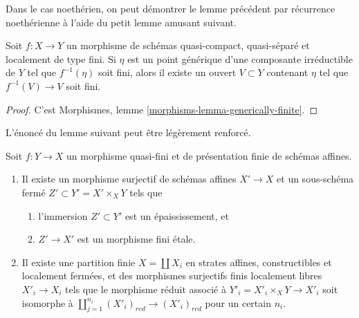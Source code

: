 \noindent
Dans le cas noeth\'erien, on peut d\'emontrer le lemme pr\'ec\'edent par
r\'ecurrence noeth\'erienne \`a l'aide du petit lemme amusant suivant.

\begin{lemma}
\label{lemma-generically-finite}
Soit $f: X \to Y$ un morphisme de sch\'emas quasi-compact,
quasi-s\'epar\'e et localement de type fini. Si $\eta$ est un point g\'en\'erique
d'une composante irr\'eductible de $Y$ tel que $f^{-1}(\eta)$ soit fini, alors
il existe un ouvert $V \subset Y$ contenant $\eta$ tel que
$f^{-1}(V) \to V$ soit fini.
\end{lemma}

\begin{proof}
C'est Morphismes, lemme \ref{morphisms-lemma-generically-finite}.
\end{proof}

\noindent
L'\'enonc\'e du lemme suivant peut \^etre l\'eg\`erement renforc\'e.

\begin{lemma}
\label{lemma-decompose-quasi-finite-morphism}
Soit $f : Y \to X$ un morphisme quasi-fini et de pr\'esentation finie
de sch\'emas affines.
\begin{enumerate}
\item Il existe un morphisme surjectif de sch\'emas affines $X' \to X$ et un
sous-sch\'ema ferm\'e $Z' \subset Y' = X' \times_X Y$ tels que
\begin{enumerate}
\item l'immersion $Z' \subset Y'$ est un \'epaississement, et
\item $Z' \to X'$ est un morphisme fini \'etale.
\end{enumerate}
\item Il existe une partition finie $X = \coprod X_i$ en
strates affines, constructibles et localement ferm\'ees, et des morphismes surjectifs
finis localement libres $X'_i \to X_i$ tels que le morphisme r\'eduit associ\'e \`a
$Y'_i = X'_i \times_X Y \to X'_i$ soit isomorphe \`a
$\coprod_{j = 1}^{n_i} (X'_i)_{red} \to (X'_i)_{red}$ pour un certain $n_i$.
\end{enumerate}
\end{lemma}

